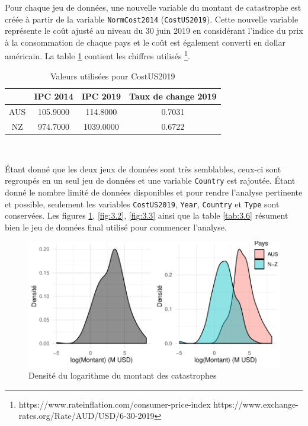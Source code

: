 Pour chaque jeu de données, une nouvelle variable du montant de catastrophe est créée à partir de la variable \texttt{NormCost2014} (\texttt{CostUS2019}). Cette nouvelle variable représente le coût ajusté au niveau du 30 juin 2019 en considérant l'indice du prix à la consommation de chaque pays et le coût est également converti en dollar américain. La table \ref{tab:3.5} contient les chiffres utilisés \footnote{https://www.rateinflation.com/consumer-price-index  \newline https://www.exchange-rates.org/Rate/AUD/USD/6-30-2019}.

\begin{table}[ht]
\centering
\begin{tabular}{cccc}
  \hline
 & IPC 2014 & IPC 2019 & Taux de change 2019 \\ 
  \hline
AUS & 105.9000 & 114.8000 & 0.7031 \\ 
  NZ & 974.7000 & 1039.0000 & 0.6722 \\ 
   \hline
\end{tabular}
\caption{Valeurs utilisées pour CostUS2019} 
\label{tab:3.5}
\end{table}\

Étant donné que les deux jeux de données sont très semblables, ceux-ci sont regroupés en un seul jeu de données et une variable \texttt{Country} est rajoutée. Étant donné le nombre limité de données disponibles et pour rendre l'analyse pertinente et possible, seulement les variables \texttt{CostUS2019}, \texttt{Year}, \texttt{Country} et \texttt{Type} sont conservées. Les figures \ref{fig:3.1}, \ref{fig:3.2}, \ref{fig:3.3} ainsi que la table \ref{tab:3.6} résument bien le jeu de données final utilisé pour commencer l'analyse.


\begin{figure}[h]
\begin{center}
\includegraphics{images/fig-005}
\end{center}
\caption{Densité du logarithme du montant des catastrophes}
\label{fig:3.1}
\end{figure}

